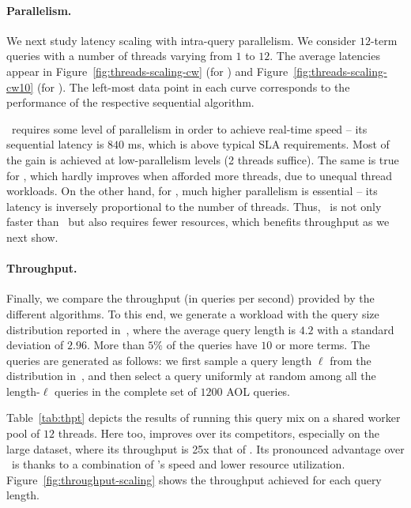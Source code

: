 {{\paragraph{Parallelism. } 
We next study latency scaling with  intra-query parallelism. 
We  consider  $12$-term queries with a number of threads varying from $1$ to $12$. 
The average latencies appear in Figure~\ref{fig:threads-scaling-cw}
(for \cw) and Figure~\ref{fig:threads-scaling-cw10} (for \cwten). 
The left-most data point in each curve corresponds to the performance of 
the respective sequential algorithm.

\alg\ requires some level of parallelism in order to achieve real-time speed -- its sequential latency is $840$ ms, which is  above typical SLA requirements. Most of the gain is achieved at low-parallelism levels (2 threads suffice). 
The same is true for \pJASS, which hardly improves when afforded more threads, due to unequal thread workloads.
On the other hand, for \pBMW, much higher parallelism is essential -- its latency is inversely proportional to the number of threads. Thus, \alg\ is not only faster 
than \pBMW\ but also requires fewer resources, which benefits throughput as we next show.


\paragraph{Throughput. } Finally, we compare the throughput (in queries per second) provided by the different
algorithms. To this end, we generate a workload with the query size distribution reported in~\cite{sigir/Guy16},
where the average query length is $4.2$ with a standard deviation of $2.96$. More than $5\%$ of the queries have $10$ or more terms.
The queries are generated as follows: we first sample a query length $\ell$ from the distribution in~\cite{sigir/Guy16}, and then 
select a query uniformly at random among all the length-$\ell$ queries in the complete set of  $1200$ AOL queries. 

Table~\ref{tab:thpt} depicts the results of running this query mix on a shared worker pool  of $12$ threads.
Here too, \alg\/ improves over its competitors, especially on the large dataset, where its throughput is 25x that of \pBMW\hi. 
Its pronounced advantage over \pBMW\ is thanks to a combination of \alg's speed and lower resource utilization.
Figure~\ref{fig:throughput-scaling} shows the throughput achieved for each query length.

}}
